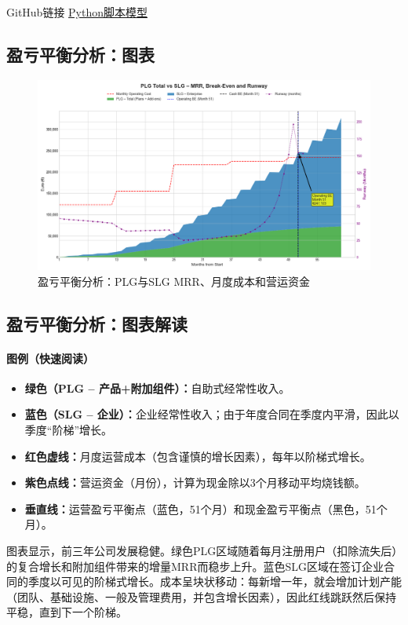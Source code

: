 \documentclass[11pt, a4paper, oneside]{article}
\begin{document}
GitHub链接 \href{https://github.com/kuduk/intellyhub-businessplan/blob/main/breakeven.v2.02.py}{Python脚本模型}

\newpage
\subsection{盈亏平衡分析：图表}
\begin{figure}[H]
    \centering 
    \includegraphics[width=\textwidth]{financial_projection.png}
    \caption{盈亏平衡分析：PLG与SLG MRR、月度成本和营运资金}
    \label{fig:break_even_analysis}
\end{figure} 
\subsection{盈亏平衡分析：图表解读}

\paragraph{图例（快速阅读）}
\begin{itemize}
  \item \textbf{绿色（PLG -- 产品+附加组件）：}自助式经常性收入。
  \item \textbf{蓝色（SLG -- 企业）：}企业经常性收入；由于年度合同在季度内平滑，因此以季度“阶梯”增长。
  \item \textbf{红色虚线：}月度运营成本（包含谨慎的增长因素），每年以阶梯式增长。
  \item \textbf{紫色点线：}营运资金（月份），计算为现金除以3个月移动平均烧钱额。
  \item \textbf{垂直线：}运营盈亏平衡点（蓝色，51个月）和现金盈亏平衡点（黑色，51个月）。
\end{itemize}

图表显示，前三年公司发展稳健。绿色PLG区域随着每月注册用户（扣除流失后）的复合增长和附加组件带来的增量MRR而稳步上升。蓝色SLG区域在签订企业合同的季度以可见的阶梯式增长。成本呈块状移动：每新增一年，就会增加计划产能（团队、基础设施、一般及管理费用，并包含增长因素），因此红线跳跃然后保持平稳，直到下一个阶梯。
\end{document}
